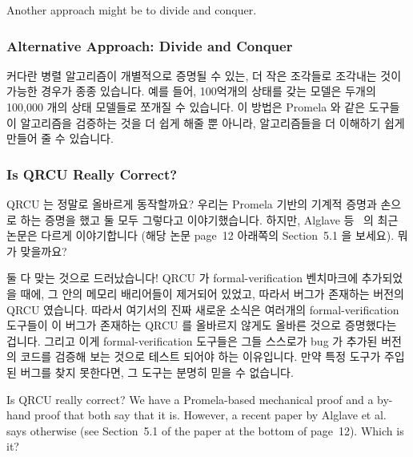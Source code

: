 Another approach might be to divide and conquer.
\fi

\subsubsection{Alternative Approach: Divide and Conquer}
\label{sec:formal:Alternative Approach: Divide and Conquer}

커다란 병렬 알고리즘이 개별적으로 증명될 수 있는, 더 작은 조각들로 조각내는
것이 가능한 경우가 종종 있습니다.
예를 들어, 100억개의 상태를 갖는 모델은 두개의 100,000 개의 상태 모델들로
쪼개질 수 있습니다.
이 방법은 Promela 와 같은 도구들이 알고리즘을 검증하는 것을 더 쉽게 해줄 뿐
아니라, 알고리즘들을 더 이해하기 쉽게 만들어 줄 수 있습니다.
\iffalse

It is often possible to break down a larger parallel algorithm into
smaller pieces, which can then be proven separately.
For example, a 10-billion-state model might be broken into a pair
of 100,000-state models.
Taking this approach not only makes it easier for tools such as
Promela to verify your algorithms, it can also make your algorithms
easier to understand.
\fi

\subsubsection{Is QRCU Really Correct?}
\label{sec:formal:Is QRCU Really Correct?}

QRCU 는 정말로 올바르게 동작할까요?
우리는 Promela 기반의 기계적 증명과 손으로 하는 증명을 했고 둘 모두 그렇다고
이야기했습니다.
하지만, Alglave 등~\cite{JadeAlglave2013-cav} 의 최근 논문은 다르게
이야기합니다 (해당 논문 page~12  아래쪽의 Section~5.1 을 보세요).
뭐가 맞을까요?

둘 다 맞는 것으로 드러났습니다!
QRCU 가 formal-verification 벤치마크에 추가되었을 때에, 그 안의 메모리
배리어들이 제거되어 있었고, 따라서 버그가 존재하는 버전의 QRCU 였습니다.
따라서 여기서의 진짜 새로운 소식은 여러개의 formal-verification 도구들이 이
버그가 존재하는 QRCU 를 올바르지 않게도 올바른 것으로 증명했다는 겁니다.
그리고 이게 formal-verification 도구들은 그들 스스로가 bug 가 추가된 버전의
코드를 검증해 보는 것으로 테스트 되어야 하는 이유입니다.
만약 특정 도구가 주입된 버그를 찾지 못한다면, 그 도구는 분명히 믿을 수
없습니다.
\iffalse

Is QRCU really correct?
We have a Promela-based mechanical proof and a by-hand proof that both
say that it is.
However, a recent paper by Alglave et al.~\cite{JadeAlglave2013-cav}
says otherwise (see Section~5.1 of the paper at the bottom of page~12).
Which is it?

